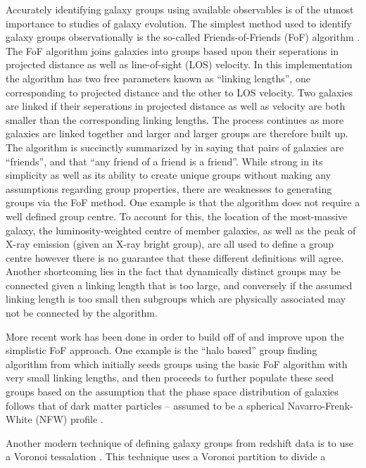Accurately identifying galaxy groups using available observables is of
the utmost importance to studies of galaxy evolution.  The simplest
method used to identify galaxy groups observationally is the
so-called Friends-of-Friends (FoF) algorithm
\citep[e.g.][]{huchra1982, press1982}.  The FoF
algorithm joins galaxies into
groups based upon their seperations in projected distance as well as
line-of-sight (LOS) velocity.  In this implementation the algorithm
has two
free parameters known as ``linking lengths'', one corresponding to
projected distance and the other to LOS velocity.  Two galaxies are
linked if their seperations in projected distance as well as velocity
are both smaller than the corresponding linking lengths.  The process
continues as more galaxies are linked together and larger and larger
groups are therefore built up.  The algorithm is succinctly summarized
by \citet{press1982} in saying that pairs of galaxies are
``friends'', and that ``any friend of a friend is a friend''.  While
strong in its simplicity as well as its ability to create unique
groups without making any assumptions regarding group properties,
there are weaknesses to generating groups via the FoF method.  One
example is that the algorithm does not require a well defined group
centre.  To account for this, the location of the most-massive galaxy,
the luminosity-weighted centre of member galaxies, as well as the peak
of X-ray emission (given an X-ray bright group), are all used to
define a group centre however there is no guarantee that these
different definitions will agree.  Another shortcoming lies in the
fact that dynamically distinct groups may be connected given a linking
length that is too large, and conversely if the assumed linking length
is too small then subgroups which are physically associated may not be
connected by the algorithm.
\par
More recent work has been done in order to build off of and improve
upon the simplistic FoF approach.  One example is the ``halo based''
group finding algorithm from \citet{yang2005, yang2007} which
initially seeds groups using the basic FoF algorithm with very small
linking lengths, and then proceeds to further populate these seed
groups based on the assumption that the phase space distribution of
galaxies follows that of dark matter particles -- assumed to be a
spherical Navarro-Frenk-White (NFW) profile \citep{navarro1997}.
\par
Another modern technique of defining galaxy groups from redshift data
is to use a Voronoi tessalation \citep{marinoni2002, gerke2005,
  gerke2012}.  This technique uses a Voronoi partition to divide a

